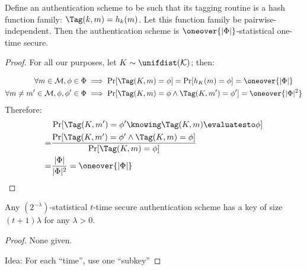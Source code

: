\begin{theorem}
    Define an authentication scheme to be such that its tagging routine is a hash function family: $\Tag(k, m) = h_k(m)$. Let this function family be pairwise-independent. Then the authentication scheme is $\oneover{|\Phi|}$-statistical one-time secure. 
\end{theorem}

\begin{proof}
    For all our purposes, let $K \sim \unifdist(\K)$; then:

    \begin{align*}
        \forall m \in \M, \phi \in \Phi &\implies \Pr[\Tag(K, m) = \phi] = \Pr[h_K(m) = \phi] = \oneover{|\Phi|} \\
        \forall m \neq m' \in \M, \phi, \phi' \in \Phi &\implies \Pr[\Tag(K, m) = \phi \wedge \Tag(K, m') = \phi'] = \oneover{|\Phi|^2} \\
    \end{align*}
    Therefore:
    \begin{align*}
        & \Pr[\Tag(K, m') = \phi' \knowing \Tag(K, m) \evaluatesto \phi] \\
        =& \frac{\Pr[\Tag(K, m') = \phi' \wedge \Tag(K, m) = \phi]}{\Pr[\Tag(K, m) = \phi]} \\
        =& \frac{|\Phi|}{|\Phi|^2} = \oneover{|\Phi|}
    \end{align*}
\end{proof}

\begin{theorem}
    Any $(2^{-\lambda})$-statistical $t$-time secure authentication scheme has a key of size $(t + 1) \lambda$ for any $\lambda > 0$.
\end{theorem}

\begin{proof}
    None given.

    Idea: For each ``time'', use one ``subkey''
\end{proof}
